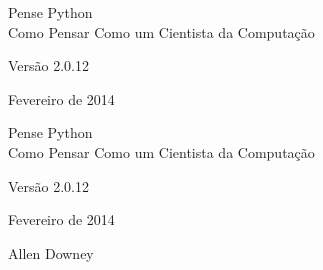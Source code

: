 \documentclass[10pt]{book}
\newcommand{\theversion}{2.0.12}
\newcommand{\thedate}{Fevereiro de 2014}
\begin{document}
\begin{latexonly}

\renewcommand{\blankpage}{\thispagestyle{empty} \quad \newpage}



\thispagestyle{empty}

\begin{flushright}
\vspace*{2.0in}

\begin{spacing}{3}
{\huge Pense Python}\\
{\Large Como Pensar Como um Cientista da Computação}
\end{spacing}

\vspace{0.25in}

Versão \theversion

\thedate

\vfill

\end{flushright}


\blankpage
\blankpage

\pagebreak
\thispagestyle{empty}

\begin{flushright}
\vspace*{2.0in}

\begin{spacing}{3}
{\huge Pense Python}\\
{\Large Como Pensar Como um Cientista da Computação}
\end{spacing}

\vspace{0.25in}

Versão \theversion

\thedate

\vspace{1in}


{\Large
Allen Downey\\
}


\vspace{0.5in}


\end{flushright}
\end{latexonly}
\end{document}
